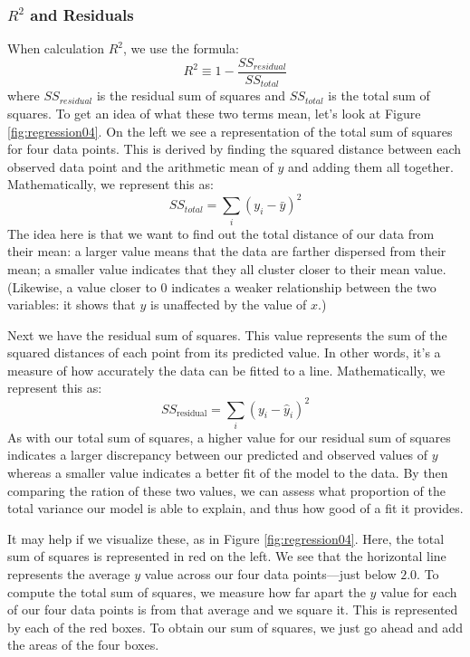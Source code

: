 \subsubsection{$R^2$ and Residuals}
When calculation $R^2$, we use the formula:
\begin{equation}
R^2 \equiv 1-\frac{SS_{residual}}{SS_{total}}
\end{equation}
where $SS_{residual}$ is the residual sum of squares and $SS_{total}$ is the total sum of squares. To get an idea of what these two terms mean, let's look at Figure \ref{fig:regression04}. On the left we see a representation of the total sum of squares for four data points. This is derived by finding the squared distance between each observed data point and the arithmetic mean of $y$ and adding them all together. Mathematically, we represent this as:
\begin{equation*}
SS_{total} =\sum_i \left(y_i-\bar{y}\right)^2
\end{equation*}
The idea here is that we want to find out the total distance of our data from their mean: a larger value means that the data are farther dispersed from their mean; a smaller value indicates that they all cluster closer to their mean value. (Likewise, a value closer to 0 indicates a weaker relationship between the two variables: it shows that $y$ is unaffected by the value of $x$.)

Next we have the residual sum of squares. This value represents the sum of the squared distances of each point from its predicted value. In other words, it's a measure of how accurately the data can be fitted to a line. Mathematically, we represent this as:
\begin{equation*}
SS_\text{residual}=\sum_i \left(y_i - \hat{y}_i\right)^2
\end{equation*}
As with our total sum of squares, a higher value for our residual sum of squares indicates a larger discrepancy between our predicted and observed values of $y$ whereas a smaller value indicates a better fit of the model to the data. By then comparing the ration of these two values, we can assess what proportion of the total variance our model is able to explain, and thus how good of a fit it provides.

It may help if we visualize these, as in Figure \ref{fig:regression04}. Here, the total sum of squares is represented in red on the left.  We see that the horizontal line represents the average $y$ value across our four data points---just below $2.0$. To compute the total sum of squares, we measure how far apart the $y$ value for each of our four data points is from that average and we square it. This is represented by each of the red boxes. To obtain our sum of squares, we just go ahead and add the areas of the four boxes.

